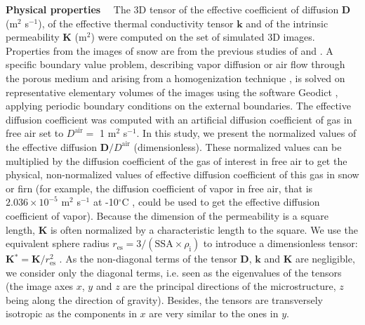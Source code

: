\documentclass[draft,ms]{agujournal2019}
\begin{document}


\noindent \textbf{Physical properties}$\quad$ The 3D tensor of the effective coefficient of diffusion  $\mathbf{D}$ (m$^2$ s$^{-1}$), of the effective thermal conductivity tensor $\mathbf{k}$ and of the intrinsic permeability  $\mathbf{K}$ (m$^2$) were computed on the set of simulated 3D images.
Properties from the images of snow are from the previous studies of  and . 
A specific boundary value problem, describing vapor diffusion or air flow through the porous medium and arising from a homogenization technique \cite{auriault2009homogenization, calonne2015macroscopic}, is solved on representative elementary volumes of the images using the software Geodict \cite{thoemen_3d_2008}, applying periodic boundary conditions on the external boundaries.
The effective diffusion coefficient was computed with an artificial diffusion coefficient of gas in free air set to $D^{\mathrm{air}} =$ 1 m$^2$ s$^{-1}$. In this study, we present the normalized values of the effective diffusion $\mathbf{D} / D^{\mathrm{air}}$ (dimensionless). These normalized values can be multiplied by the diffusion coefficient of the gas of interest in free air to get the physical, non-normalized values of effective diffusion coefficient of this gas in snow or firn (for example, the diffusion coefficient of vapor in free air, that is $2.036 \times 10^{-5}$ m$^2$ s$^{-1}$ at -10$^\circ$C \cite{massman_review_1998}, could be used to get the effective diffusion coefficient of vapor). Because the dimension of the permeability is a square length, $\mathbf{K}$ is often normalized by a characteristic length to the square. We use the equivalent sphere radius $r_{\mathrm{es}}=3/(\mathrm{SSA} \times \rho_{\mathrm{i}})$ to introduce a dimensionless tensor: $\mathbf{K}\mathrm{^{*}} = \mathbf{K}/r_{\mathrm{es}}^2$  \cite{calonne_3D_2012}.
As the non-diagonal terms of the tensor $\mathbf{D}$, $\mathbf{k}$ and  $\mathbf{K}$ are negligible, we consider only the diagonal terms, i.e. seen as the eigenvalues of the tensors (the image axes $x$, $y$ and $z$ are the principal directions of the microstructure, $z$ being along the direction of gravity). Besides, the tensors are transversely isotropic as the components in $x$ are very similar to the ones in $y$.
\end{document}

